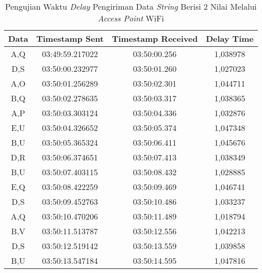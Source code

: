 \begin{table}[!ht]
  \centering
  \caption{Pengujian Waktu \emph{Delay} Pengiriman Data \emph{String} Berisi 2 Nilai Melalui \emph{Access Point} WiFi}
  \label{tbl:delayWiFi2}
  \begin{tabular}{|ccc|c|}
  \hline
  \multicolumn{1}{|c|}{Data} & \multicolumn{1}{c|}{Timestamp Sent}  & Timestamp Received & Delay Time  \\ \hline
  \multicolumn{1}{|c|}{A,Q}  & \multicolumn{1}{c|}{03:49:59.217022} & 03:50:00.256       & 1,038978    \\ \hline
  \multicolumn{1}{|c|}{D,S}  & \multicolumn{1}{c|}{03:50:00.232977} & 03:50:01.260       & 1,027023    \\ \hline
  \multicolumn{1}{|c|}{A,O}  & \multicolumn{1}{c|}{03:50:01.256289} & 03:50:02.301       & 1,044711    \\ \hline
  \multicolumn{1}{|c|}{B,Q}  & \multicolumn{1}{c|}{03:50:02.278635} & 03:50:03.317       & 1,038365    \\ \hline
  \multicolumn{1}{|c|}{A,P}  & \multicolumn{1}{c|}{03:50:03.303124} & 03:50:04.336       & 1,032876    \\ \hline
  \multicolumn{1}{|c|}{E,U}  & \multicolumn{1}{c|}{03:50:04.326652} & 03:50:05.374       & 1,047348    \\ \hline
  \multicolumn{1}{|c|}{B,U}  & \multicolumn{1}{c|}{03:50:05.365324} & 03:50:06.411       & 1,045676    \\ \hline
  \multicolumn{1}{|c|}{D,R}  & \multicolumn{1}{c|}{03:50:06.374651} & 03:50:07.413       & 1,038349    \\ \hline
  \multicolumn{1}{|c|}{B,U}  & \multicolumn{1}{c|}{03:50:07.403115} & 03:50:08.432       & 1,028885    \\ \hline
  \multicolumn{1}{|c|}{E,Q}  & \multicolumn{1}{c|}{03:50:08.422259} & 03:50:09.469       & 1,046741    \\ \hline
  \multicolumn{1}{|c|}{D,S}  & \multicolumn{1}{c|}{03:50:09.452763} & 03:50:10.486       & 1,033237    \\ \hline
  \multicolumn{1}{|c|}{A,Q}  & \multicolumn{1}{c|}{03:50:10.470206} & 03:50:11.489       & 1,018794    \\ \hline
  \multicolumn{1}{|c|}{B,V}  & \multicolumn{1}{c|}{03:50:11.513787} & 03:50:12.556       & 1,042213    \\ \hline
  \multicolumn{1}{|c|}{D,S}  & \multicolumn{1}{c|}{03:50:12.519142} & 03:50:13.559       & 1,039858    \\ \hline
  \multicolumn{1}{|c|}{B,U}  & \multicolumn{1}{c|}{03:50:13.547184} & 03:50:14.595       & 1,047816    \\ \hline

\end{tabular}
\end{table}
